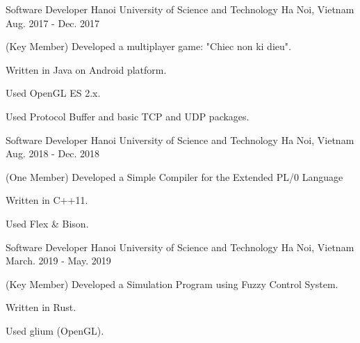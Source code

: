 \begin{cventries}

\cventry
{Software Developer} %
{Hanoi University of Science and Technology} %
{Ha Noi, Vietnam} %
{Aug. 2017 - Dec. 2017} %
{ %
\begin{cvitems}
\item{(Key Member) Developed a multiplayer game: "Chiec non ki dieu".}
\item{Written in Java on Android platform.}
\item{Used OpenGL ES 2.x.}
\item{Used Protocol Buffer and basic TCP and UDP packages.}
\end{cvitems}
}


\cventry
{Software Developer} %
{Hanoi University of Science and Technology} %
{Ha Noi, Vietnam} %
{Aug. 2018 - Dec. 2018} %
{ %
\begin{cvitems}
\item{(One Member) Developed a Simple Compiler for the Extended PL/0 Language}
\item{Written in C++11.}
\item{Used Flex \& Bison.}
\end{cvitems}
}


\cventry
{Software Developer} %
{Hanoi University of Science and Technology} %
{Ha Noi, Vietnam} %
{March. 2019 - May. 2019} %
{ %
\begin{cvitems}
\item{(Key Member) Developed a Simulation Program using Fuzzy Control System.}
\item{Written in Rust.}
\item{Used glium (OpenGL).}
\end{cvitems}
}


\end{cventries}
